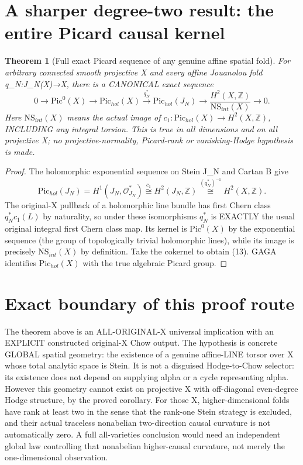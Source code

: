 \documentclass[11pt]{article}
\newtheorem{theorem}{Theorem}
\begin{document}
\section{A sharper degree-two result: the entire Picard causal kernel}

\begin{theorem}[Full exact Picard sequence of any genuine affine spatial fold]
For arbitrary connected smooth projective X
and every affine Jouanolou fold q_N:J_N(X)→X,
there is a CANONICAL exact sequence
\[
 \boxed{
 0\to\mathrm{Pic}^0(X)
   \to\mathrm{Pic}_{hol}(X)
   \overset{q_N^*}{\longrightarrow}
      \mathrm{Pic}_{hol}(J_N)
   \longrightarrow
   \frac{H^2(X,\mathbb Z)}
        {\mathrm{NS}_{int}(X)}
   \to0.
 }                                                        \tag{13}
\]
Here $\mathrm{NS}_{int}(X)$ means the actual
image of $c_1:\mathrm{Pic}_{hol}(X)\to
H^2(X,\mathbb Z)$, INCLUDING any integral torsion.
This is true in all dimensions and on
all projective X; no projective-normality,
Picard-rank or vanishing-Hodge hypothesis is made.
\end{theorem}
\begin{proof}
The holomorphic exponential sequence on Stein J_N
and Cartan B give
\[
 \mathrm{Pic}_{hol}(J_N)
 =H^1(J_N,\mathcal O^*_{J_N})
 \overset{c_1}\cong H^2(J_N,\mathbb Z)
 \overset{(q_N^*)^{-1}}\cong H^2(X,\mathbb Z).
\]
The original-X pullback of a holomorphic
line bundle has first Chern class
$q_N^*c_1(L)$ by naturality,
so under these isomorphisms $q_N^*$
is EXACTLY the usual original
integral first Chern class map.
Its kernel is
$\mathrm{Pic}^0(X)$ by the exponential
sequence (the group of topologically
trivial holomorphic lines), while its
image is precisely $\mathrm{NS}_{int}(X)$
by definition. Take the cokernel to
obtain (13). GAGA identifies
$\mathrm{Pic}_{hol}(X)$ with the true
algebraic Picard group.
\end{proof}

\section{Exact boundary of this proof route}
The theorem above is an ALL-ORIGINAL-X universal implication
with an EXPLICIT constructed original-X Chow output.
The hypothesis is concrete GLOBAL spatial geometry:
the existence of a genuine affine-LINE torsor over X
whose total analytic space is Stein.
It is not a disguised Hodge-to-Chow selector:
its existence does not depend on supplying alpha
or a cycle representing alpha.
However this geometry cannot exist on projective X with
off-diagonal even-degree Hodge structure, by the proved
corollary. For those X, higher-dimensional folds have
rank at least two in the sense that the rank-one
Stein strategy is excluded, and their actual
traceless nonabelian two-direction causal curvature
is not automatically zero.
A full all-varieties conclusion would need an independent
global law controlling that nonabelian higher-causal
curvature, not merely the one-dimensional observation.
\end{document}
